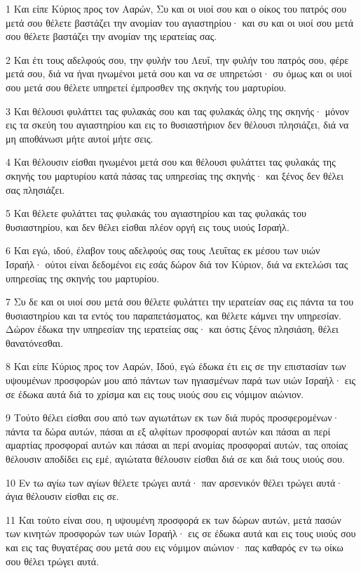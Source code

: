 \par 1 Και είπε Κύριος προς τον Ααρών, Συ και οι υιοί σου και ο οίκος του πατρός σου μετά σου θέλετε βαστάζει την ανομίαν του αγιαστηρίου· και συ και οι υιοί σου μετά σου θέλετε βαστάζει την ανομίαν της ιερατείας σας.
\par 2 Και έτι τους αδελφούς σου, την φυλήν του Λευΐ, την φυλήν του πατρός σου, φέρε μετά σου, διά να ήναι ηνωμένοι μετά σου και να σε υπηρετώσι· συ όμως και οι υιοί σου μετά σου θέλετε υπηρετεί έμπροσθεν της σκηνής του μαρτυρίου.
\par 3 Και θέλουσι φυλάττει τας φυλακάς σου και τας φυλακάς όλης της σκηνής· μόνον εις τα σκεύη του αγιαστηρίου και εις το θυσιαστήριον δεν θέλουσι πλησιάζει, διά να μη αποθάνωσι μήτε αυτοί μήτε σεις.
\par 4 Και θέλουσιν είσθαι ηνωμένοι μετά σου και θέλουσι φυλάττει τας φυλακάς της σκηνής του μαρτυρίου κατά πάσας τας υπηρεσίας της σκηνής· και ξένος δεν θέλει σας πλησιάζει.
\par 5 Και θέλετε φυλάττει τας φυλακάς του αγιαστηρίου και τας φυλακάς του θυσιαστηρίου, και δεν θέλει είσθαι πλέον οργή εις τους υιούς Ισραήλ.
\par 6 Και εγώ, ιδού, έλαβον τους αδελφούς σας τους Λευΐτας εκ μέσου των υιών Ισραήλ· ούτοι είναι δεδομένοι εις εσάς δώρον διά τον Κύριον, διά να εκτελώσι τας υπηρεσίας της σκηνής του μαρτυρίου.
\par 7 Συ δε και οι υιοί σου μετά σου θέλετε φυλάττει την ιερατείαν σας εις πάντα τα του θυσιαστηρίου και τα εντός του παραπετάσματος, και θέλετε κάμνει την υπηρεσίαν. Δώρον έδωκα την υπηρεσίαν της ιερατείας σας· και όστις ξένος πλησιάση, θέλει θανατόνεσθαι.
\par 8 Και είπε Κύριος προς τον Ααρών, Ιδού, εγώ έδωκα έτι εις σε την επιστασίαν των υψουμένων προσφορών μου από πάντων των ηγιασμένων παρά των υιών Ισραήλ· εις σε έδωκα αυτά διά το χρίσμα και εις τους υιούς σου εις νόμιμον αιώνιον.
\par 9 Τούτο θέλει είσθαι σου από των αγιωτάτων εκ των διά πυρός προσφερομένων· πάντα τα δώρα αυτών, πάσαι αι εξ αλφίτων προσφοραί αυτών και πάσαι αι περί αμαρτίας προσφοραί αυτών και πάσαι αι περί ανομίας προσφοραί αυτών, τας οποίας θέλουσιν αποδίδει εις εμέ, αγιώτατα θέλουσιν είσθαι διά σε και διά τους υιούς σου.
\par 10 Εν τω αγίω των αγίων θέλετε τρώγει αυτά· παν αρσενικόν θέλει τρώγει αυτά· άγια θέλουσιν είσθαι εις σε.
\par 11 Και τούτο είναι σου, η υψουμένη προσφορά εκ των δώρων αυτών, μετά πασών των κινητών προσφορών των υιών Ισραήλ· εις σε έδωκα αυτά και εις τους υιούς σου και εις τας θυγατέρας σου μετά σου εις νόμιμον αιώνιον· πας καθαρός εν τω οίκω σου θέλει τρώγει αυτά.
